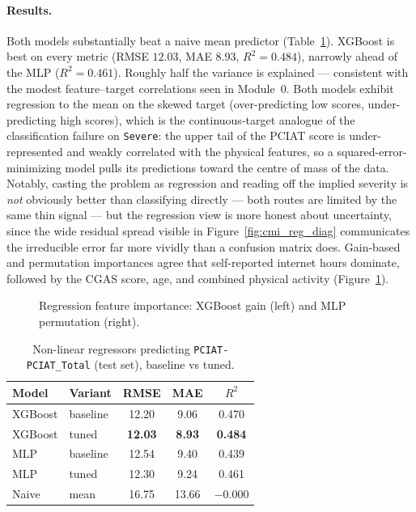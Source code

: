 \paragraph{Results.} Both models substantially beat a naive mean predictor (Table~\ref{tab:cmi_reg}). XGBoost is best on every metric (RMSE $12.03$, MAE $8.93$, $R^2=0.484$), narrowly ahead of the MLP ($R^2=0.461$). Roughly half the variance is explained --- consistent with the modest feature--target correlations seen in Module~0. Both models exhibit regression to the mean on the skewed target (over-predicting low scores, under-predicting high scores), which is the continuous-target analogue of the classification failure on \texttt{Severe}: the upper tail of the PCIAT score is under-represented and weakly correlated with the physical features, so a squared-error-minimizing model pulls its predictions toward the centre of mass of the data. Notably, casting the problem as regression and reading off the implied severity is \emph{not} obviously better than classifying directly --- both routes are limited by the same thin signal --- but the regression view is more honest about uncertainty, since the wide residual spread visible in Figure~\ref{fig:cmi_reg_diag} communicates the irreducible error far more vividly than a confusion matrix does. Gain-based and permutation importances agree that self-reported internet hours dominate, followed by the CGAS score, age, and combined physical activity (Figure~\ref{fig:cmi_reg_importance}).

\begin{figure}[h]
    \centering
    \caption{Regression feature importance: XGBoost gain (left) and MLP permutation (right).}
    \label{fig:cmi_reg_importance}
\end{figure}

\begin{table}[H]
\centering
\small
\caption{Non-linear regressors predicting \texttt{PCIAT-PCIAT\_Total} (test set), baseline vs tuned.}
\label{tab:cmi_reg}
\begin{tabular}{l l c c c}
\hline
Model & Variant & RMSE & MAE & $R^2$ \\
\hline
XGBoost & baseline & 12.20 & 9.06 & 0.470 \\
XGBoost & tuned    & \textbf{12.03} & \textbf{8.93} & \textbf{0.484} \\
MLP     & baseline & 12.54 & 9.40 & 0.439 \\
MLP     & tuned    & 12.30 & 9.24 & 0.461 \\
Naive   & mean     & 16.75 & 13.66 & $-0.000$ \\
\hline
\end{tabular}
\end{table}

